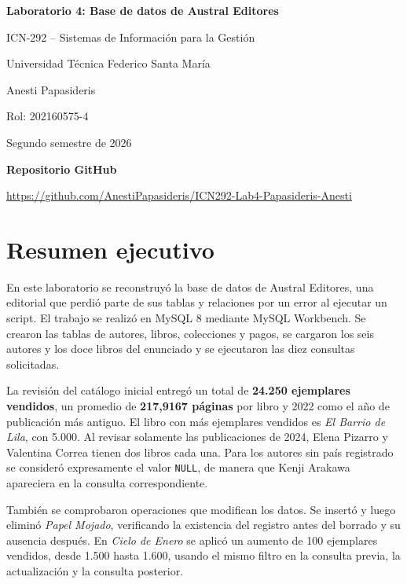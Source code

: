 \documentclass[11pt,a4paper]{article}
\begin{document}
\begin{center}
  {\Large\bfseries Laboratorio 4: Base de datos de Austral Editores\par}
  \vspace{0.25cm}
  {ICN-292 -- Sistemas de Información para la Gestión\par}
  {Universidad Técnica Federico Santa María\par}
  \vspace{0.35cm}
  {Anesti Papasideris\par}
  {Rol: 202160575-4\par}
  {Segundo semestre de 2026\par}
  \vspace{0.35cm}
  {\small\textbf{Repositorio GitHub}\par}
  {\footnotesize\url{https://github.com/AnestiPapasideris/ICN292-Lab4-Papasideris-Anesti}\par}
\end{center}

\section*{Resumen ejecutivo}

En este laboratorio se reconstruyó la base de datos de Austral Editores, una editorial que perdió parte de sus tablas y relaciones por un error al ejecutar un script. El trabajo se realizó en MySQL 8 mediante MySQL Workbench. Se crearon las tablas de autores, libros, colecciones y pagos, se cargaron los seis autores y los doce libros del enunciado y se ejecutaron las diez consultas solicitadas.

La revisión del catálogo inicial entregó un total de \textbf{24.250 ejemplares vendidos}, un promedio de \textbf{217,9167 páginas} por libro y 2022 como el año de publicación más antiguo. El libro con más ejemplares vendidos es \textit{El Barrio de Lila}, con 5.000. Al revisar solamente las publicaciones de 2024, Elena Pizarro y Valentina Correa tienen dos libros cada una. Para los autores sin país registrado se consideró expresamente el valor \texttt{NULL}, de manera que Kenji Arakawa apareciera en la consulta correspondiente.

También se comprobaron operaciones que modifican los datos. Se insertó y luego eliminó \textit{Papel Mojado}, verificando la existencia del registro antes del borrado y su ausencia después. En \textit{Cielo de Enero} se aplicó un aumento de 100 ejemplares vendidos, desde 1.500 hasta 1.600, usando el mismo filtro en la consulta previa, la actualización y la consulta posterior.
\end{document}
